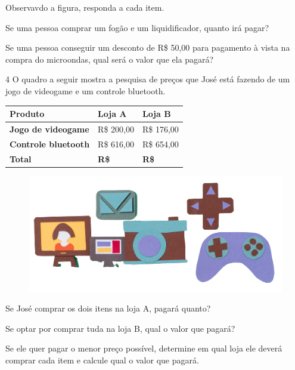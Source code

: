 \pagebreak

Observavdo a figura, responda a cada item.

\begin{escolha}
\item Se uma pessoa comprar um fogão e um liquidificador, quanto irá pagar?\\

\item Se uma pessoa conseguir um desconto de R\$ 50,00 para pagamento à
  vista na compra do microondas, qual será o valor que ela pagará?\\
\end{escolha}

\num{4} O quadro a seguir mostra a pesquisa de preços que José está fazendo
de um jogo de videogame e um controle bluetooth.

\begin{longtable}[]{@{}lll@{}}
\toprule
\hline
\textbf{Produto} & \textbf{Loja A} & \textbf{Loja B}\tabularnewline
\hline
\midrule
\endhead
\textbf{Jogo de videogame} & R\$ 200,00 & R\$ 176,00\tabularnewline
\hline
\textbf{Controle bluetooth} & R\$ 616,00 & R\$ 654,00\tabularnewline
\hline
\hline
\textbf{Total} & \textbf{R\$} & \textbf{R\$}\tabularnewline
\bottomrule
\end{longtable}

\begin{figure}[htpb!]
\centering
\includegraphics[width=.6\textwidth]{./media/image67a.png}
\end{figure}

\begin{escolha}
\item Se José comprar os dois itens na loja A, pagará quanto?\\

\item Se optar por comprar tuda na loja B, qual o valor que pagará?\\

\item Se ele quer pagar o menor preço possível, determine em qual loja ele
  deverá comprar cada item e calcule qual o valor que pagará.\\
\end{escolha}

